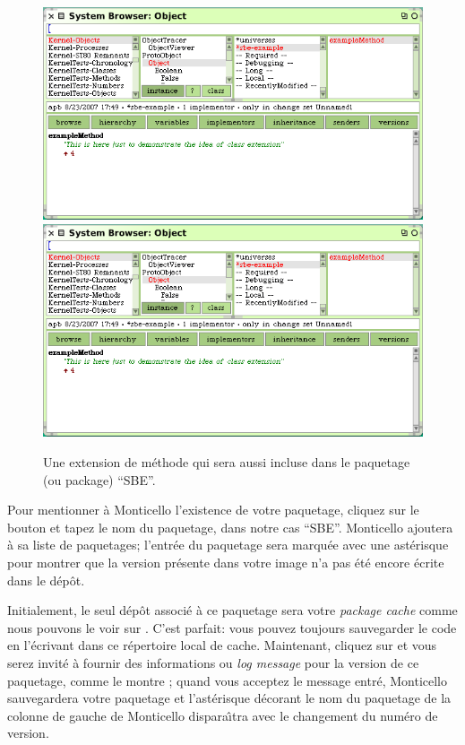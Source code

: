 \documentclass[a4paper,10pt,twoside]{book}
\begin{document}
\begin{figure}[btp]
	\begin{center}
	\ifluluelse
		{\includegraphics[width=\textwidth]{MCnewmethod}}
		{\includegraphics[scale=0.7]{MCnewmethod}}
	\end{center}
	\caption{Une extension de m\'ethode qui sera aussi incluse dans le paquetage (ou package) ``SBE''.}
	\label{fig:MCnewmethod}
\end{figure}

Pour mentionner \`a Monticello l'existence de votre paquetage, 
cliquez sur le bouton  et tapez le nom du paquetage,
dans notre cas ``SBE''.
Monticello ajoutera  \`a sa liste de paquetages;
l'entr\'ee du paquetage sera marqu\'ee avec une ast\'erisque pour
montrer que la version pr\'esente dans votre image n'a pas
\'et\'e encore \'ecrite dans le d\'ep\^ot.

Initialement, le seul d\'ep\^ot associ\'e \`a ce paquetage sera votre
\emph{package cache} comme nous pouvons le voir sur .
C'est parfait: vous pouvez toujours sauvegarder le code en l'\'ecrivant
dans ce r\'epertoire local de cache.
Maintenant, cliquez sur  et vous serez invit\'e \`a
fournir des informations ou \emph{log message} pour la version de ce 
paquetage, comme le montre ; 
quand vous acceptez le message entr\'e, Monticello sauvegardera votre paquetage
et l'ast\'erisque d\'ecorant le nom du paquetage de la colonne de gauche
de Monticello dispara\^{\i}tra avec le changement du num\'ero de version.
\end{document}
